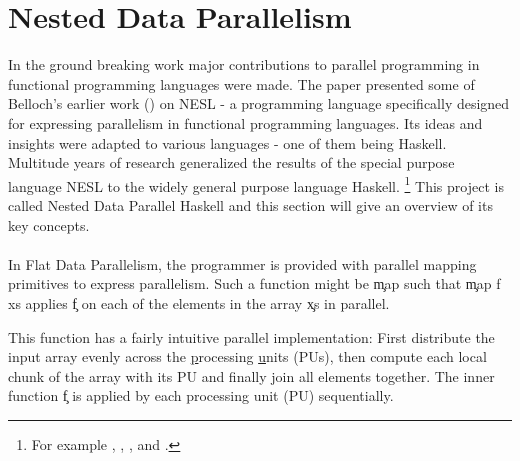 \section{Nested Data Parallelism}
  \label{section:ndpintro}
  
  In the ground breaking work \cite{Belloch1996}
  major contributions to parallel programming in
  functional programming languages were made.
  The paper presented some of Belloch's earlier work (\cite{NepaBelloch1993}) on NESL
  - a programming language specifically designed for expressing parallelism
  in functional programming languages. Its ideas and insights were
  adapted to various languages - one of them being Haskell.
  Multitude years of research generalized the
  results of the special purpose language NESL
  to the widely general purpose language Haskell.
  \footnote{For example \cite{Harness2008}, \cite{DPHStatus2007},
  \cite{EffiVect2012Lipp}, \cite{HighOrdFlat2006} and \cite{DistTypes1999}.}
  This project is called Nested Data Parallel Haskell and this section will give
  an overview of its key concepts.
  
  \paragraph{}
    In Flat Data Parallelism, the programmer is provided with parallel mapping primitives
    to express parallelism. Such a function might be \c{map} such that \c{map f xs} applies \c{f}
    on each of the elements in the array \c{xs} in parallel.
    
    
    
    This function has a fairly intuitive parallel implementation:
    First distribute the input array evenly across the \underline{p}rocessing \underline{u}nits (PUs),
    then compute each local chunk of the array with its PU and finally join all elements together.
    The inner function \c{f} is applied by each processing unit (PU) sequentially.
    
    
